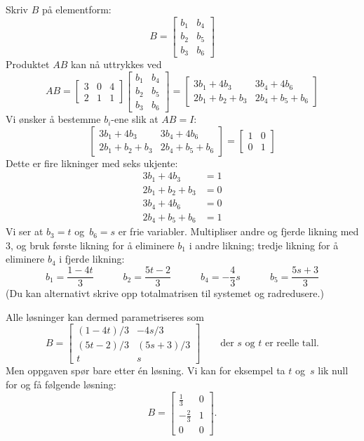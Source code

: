 \documentclass[notitlepage,a4paper,12pt,norsk]{IMFeksamen}
\newcommand{\0}{\V{0}}
\newcommand{\oppgslutt}{
\begin{center}
\pgfornament[width=6cm]{88}
\end{center}
}
\newenvironment{losning}{\begin{oppgave}}{\oppgslutt\end{oppgave}}
\begin{document}
\begin{losning}
Skriv $B$ på elementform:
\[
B=\begin{bmatrix}
b_1 & b_4\\
b_2 & b_5\\
b_3 & b_6
\end{bmatrix}
\]
Produktet $AB$ kan nå uttrykkes ved 
\[
AB=
\begin{bmatrix}
3 & 0 & 4 \\
2 & 1 & 1
\end{bmatrix}
\begin{bmatrix}
b_1 & b_4\\
b_2 & b_5\\
b_3 & b_6
\end{bmatrix}=
\begin{bmatrix}
3b_1+4b_3 & 3b_4+4b_6\\
2b_1+b_2+b_3 & 2b_4+b_5+b_6
\end{bmatrix}
\]
Vi ønsker å bestemme $b_i$-ene slik at $AB=I$:
\[
\begin{bmatrix}
3b_1+4b_3 & 3b_4+4b_6\\
2b_1+b_2+b_3 & 2b_4+b_5+b_6
\end{bmatrix}
=
\begin{bmatrix}
1 & 0\\
0 & 1
\end{bmatrix}
\]
Dette er fire likninger med seks ukjente:
\begin{align*}
3b_1+4b_3&=1\\
2b_1+b_2+b_3&=0\\
3b_4+4b_6&=0\\
2b_4+b_5+b_6&=1
\end{align*}
Vi ser at $b_3=t$ og~$b_6=s$ er frie variabler. Multipliser andre og
fjerde likning med $3$, og bruk første likning for å eliminere $b_1$ i
andre likning; tredje likning for å eliminere $b_4$ i fjerde likning:
\[
b_1 = \frac{1-4t}{3} \qquad\quad
b_2 = \frac{5t-2}{3} \qquad\quad
b_4 = -\frac{4}{3}s \qquad\quad
b_5 = \frac{5s+3}{3}
\]
(Du kan alternativt skrive opp totalmatrisen til systemet og
radredusere.)

Alle løsninger kan dermed parametriseres som
\[
B =
\begin{bmatrix}
(1-4t)/3 & -4s/3 \\
(5t-2)/3 & (5s+3)/3\\
t & s
\end{bmatrix}
\qquad\text{der $s$ og~$t$ er reelle tall.}
\]
Men oppgaven spør bare etter én løsning.
Vi kan for eksempel ta $t$ og~$s$ lik null for og få følgende løsning:
\[
B=
\begin{bmatrix}
\frac{1}{3} & 0\\
-\frac{2}{3} & 1\\
0 & 0
\end{bmatrix}.
\]
\end{losning}
\end{document}
